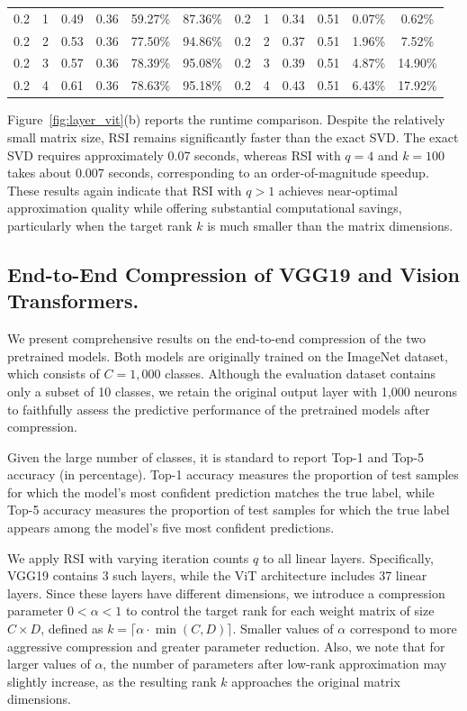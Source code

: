\documentclass[twoside,leqno,onecolumn]{article}
\begin{document}
\begin{table}[t]
\begin{tabular}{cccccc|cccccc}
 0.2 &  1 &  0.49 &  0.36 &  59.27\%  &  87.36\% & 0.2 & 1 &  0.34& 0.51 & 0.07\% & 0.62\% \\
0.2 & 2 & 0.53 & 0.36 & 77.50\% & 94.86\% & 0.2 & 2 & 0.37 & 0.51 &1.96\%  & 7.52\% \\
0.2 & 3 & 0.57 & 0.36 & 78.39\% & 95.08\% & 0.2 & 3 & 0.39 & 0.51 & 4.87\% & 14.90\% \\
\cellcolor{gray!15} 0.2 & \cellcolor{gray!15} 4 & \cellcolor{gray!15} 0.61 & \cellcolor{gray!15} 0.36 & \cellcolor{gray!15} 78.63\% & \cellcolor{gray!15} 95.18\% & 0.2 & 4 & 0.43 & 0.51 & 6.43\% & 17.92\% \\

\bottomrule
\end{tabular}
\end{table}

Figure~\ref{fig:layer_vit}(b) reports the runtime comparison. Despite the relatively small matrix size, RSI remains significantly faster than the exact SVD. The exact SVD requires approximately 0.07 seconds, whereas RSI with \(q=4\) and \(k=100\) takes about 0.007 seconds, corresponding to an order-of-magnitude speedup. These results again indicate that RSI with \(q>1\) achieves near-optimal approximation quality while offering substantial computational savings, particularly when the target rank \(k\) is much smaller than the matrix dimensions.



\subsection{End-to-End Compression of VGG19 and Vision Transformers.}
We present comprehensive results on the end-to-end compression of the two pretrained models. Both models are originally trained on the ImageNet dataset, which consists of \(C = 1{,}000\) classes. Although the evaluation dataset contains only a subset of 10 classes, we retain the original output layer with 1,000 neurons to faithfully assess the predictive performance of the pretrained models after compression. 

Given the large number of classes, it is standard to report Top-1 and Top-5 accuracy (in percentage). Top-1 accuracy measures the proportion of test samples for which the model's most confident prediction matches the true label, while Top-5 accuracy measures the proportion of test samples for which the true label appears among the model's five most confident predictions.

We apply RSI with varying iteration counts \(q\) to all linear layers. Specifically, VGG19 contains 3 such layers, while the ViT architecture includes 37 linear layers. Since these layers have different dimensions, we introduce a compression parameter \(0 < \alpha < 1\) to control the target rank for each weight matrix of size \(C \times D\), defined as \(k = \lceil \alpha\cdot \min(C, D) \rceil\). Smaller values of \(\alpha\) correspond to more aggressive compression and greater parameter reduction. Also, we note that for larger values of \(\alpha\), the number of parameters after low-rank approximation may slightly increase, as the resulting rank \(k\) approaches the original matrix dimensions.
\end{document}
